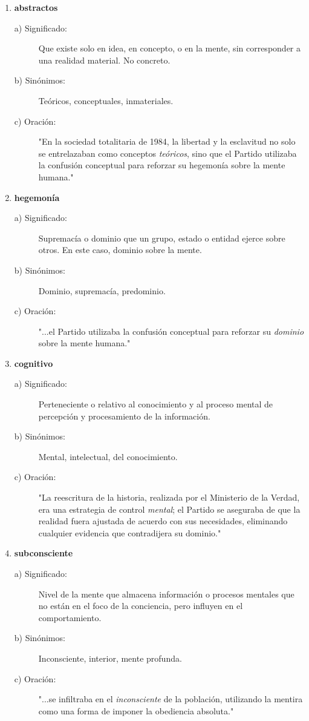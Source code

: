 \documentclass[11pt, a4paper]{article}
\begin{document}
\begin{enumerate}
    \item \textbf{abstractos}
    \begin{description}
        \item[a) Significado:] Que existe solo en idea, en concepto, o en la mente, sin corresponder a una realidad material. No concreto.
        \item[b) Sinónimos:] Teóricos, conceptuales, inmateriales.
        \item[c) Oración:] "En la sociedad totalitaria de 1984, la libertad y la esclavitud no solo se entrelazaban como conceptos \textit{teóricos}, sino que el Partido utilizaba la confusión conceptual para reforzar su hegemonía sobre la mente humana."
    \end{description}

    \item \textbf{hegemonía}
    \begin{description}
        \item[a) Significado:] Supremacía o dominio que un grupo, estado o entidad ejerce sobre otros. En este caso, dominio sobre la mente.
        \item[b) Sinónimos:] Dominio, supremacía, predominio.
        \item[c) Oración:] "...el Partido utilizaba la confusión conceptual para reforzar su \textit{dominio} sobre la mente humana."
    \end{description}

    \item \textbf{cognitivo}
    \begin{description}
        \item[a) Significado:] Perteneciente o relativo al conocimiento y al proceso mental de percepción y procesamiento de la información.
        \item[b) Sinónimos:] Mental, intelectual, del conocimiento.
        \item[c) Oración:] "La reescritura de la historia, realizada por el Ministerio de la Verdad, era una estrategia de control \textit{mental}; el Partido se aseguraba de que la realidad fuera ajustada de acuerdo con sus necesidades, eliminando cualquier evidencia que contradijera su dominio."
    \end{description}

    \item \textbf{subconsciente}
    \begin{description}
        \item[a) Significado:] Nivel de la mente que almacena información o procesos mentales que no están en el foco de la conciencia, pero influyen en el comportamiento.
        \item[b) Sinónimos:] Inconsciente, interior, mente profunda.
        \item[c) Oración:] "...se infiltraba en el \textit{inconsciente} de la población, utilizando la mentira como una forma de imponer la obediencia absoluta."
    \end{description}


\end{enumerate}
\end{document}
